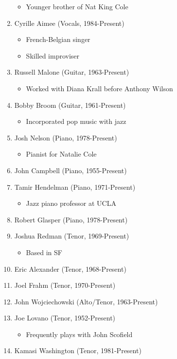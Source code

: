 \documentclass[]{article}
\providecommand{\tightlist}{%
  \setlength{\itemsep}{0pt}\setlength{\parskip}{0pt}}
\begin{document}
\begin{enumerate}
  \begin{itemize}
  \tightlist
  \item
    Younger brother of Nat King Cole
  \end{itemize}
\item
  Cyrille Aimee (Vocals, 1984-Present)

  \begin{itemize}
  \tightlist
  \item
    French-Belgian singer
  \item
    Skilled improviser
  \end{itemize}
\item
  Russell Malone (Guitar, 1963-Present)

  \begin{itemize}
  \tightlist
  \item
    Worked with Diana Krall before Anthony Wilson
  \end{itemize}
\item
  Bobby Broom (Guitar, 1961-Present)

  \begin{itemize}
  \tightlist
  \item
    Incorporated pop music with jazz
  \end{itemize}
\item
  Josh Nelson (Piano, 1978-Present)

  \begin{itemize}
  \tightlist
  \item
    Pianist for Natalie Cole
  \end{itemize}
\item
  John Campbell (Piano, 1955-Present)
\item
  Tamir Hendelman (Piano, 1971-Present)

  \begin{itemize}
  \tightlist
  \item
    Jazz piano professor at UCLA
  \end{itemize}
\item
  Robert Glasper (Piano, 1978-Present)
\item
  Joshua Redman (Tenor, 1969-Present)

  \begin{itemize}
  \tightlist
  \item
    Based in SF
  \end{itemize}
\item
  Eric Alexander (Tenor, 1968-Present)
\item
  Joel Frahm (Tenor, 1970-Present)
\item
  John Wojciechowski (Alto/Tenor, 1963-Present)
\item
  Joe Lovano (Tenor, 1952-Present)

  \begin{itemize}
  \tightlist
  \item
    Frequently plays with John Scofield
  \end{itemize}
\item
  Kamasi Washington (Tenor, 1981-Present)
\end{enumerate}
\end{document}
